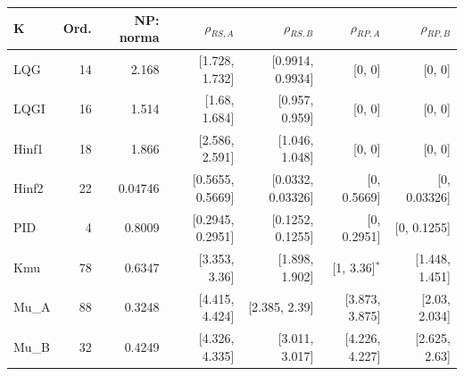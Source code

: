 \begin{center}\small\begin{tabular}{lrrrrrr}\toprule
K & Ord. & NP: norma & $\rho_{RS,A}$ & $\rho_{RS,B}$ & $\rho_{RP,A}$ & $\rho_{RP,B}$\\\midrule
LQG & 14 & 2.168 & [1.728, 1.732] & [0.9914, 0.9934] & [0, 0] & [0, 0]\\
LQGI & 16 & 1.514 & [1.68, 1.684] & [0.957, 0.959] & [0, 0] & [0, 0]\\
Hinf1 & 18 & 1.866 & [2.586, 2.591] & [1.046, 1.048] & [0, 0] & [0, 0]\\
Hinf2 & 22 & 0.04746 & [0.5655, 0.5669] & [0.0332, 0.03326] & [0, 0.5669] & [0, 0.03326]\\
PID & 4 & 0.8009 & [0.2945, 0.2951] & [0.1252, 0.1255] & [0, 0.2951] & [0, 0.1255]\\
Kmu & 78 & 0.6347 & [3.353, 3.36] & [1.898, 1.902] & [1, 3.36]$^*$ & [1.448, 1.451]\\
Mu\_A & 88 & 0.3248 & [4.415, 4.424] & [2.385, 2.39] & [3.873, 3.875] & [2.03, 2.034]\\
Mu\_B & 32 & 0.4249 & [4.326, 4.335] & [3.011, 3.017] & [4.226, 4.227] & [2.625, 2.63]\\
\bottomrule\end{tabular}
\end{center}
